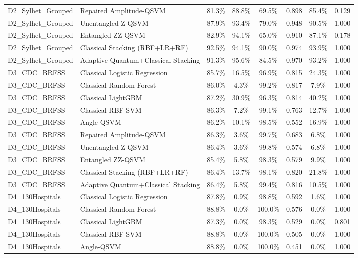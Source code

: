 \documentclass[10pt,twocolumn]{article}
\begin{document}
\begin{table}[t]
\begin{tabular}{llcccccc}
D2\_Sylhet\_Grouped & Repaired Amplitude-QSVM & 81.3\% & 88.8\% & 69.5\% & 0.898 & 85.4\% & 0.129 \\
D2\_Sylhet\_Grouped & Unentangled Z-QSVM & 87.9\% & 93.4\% & 79.0\% & 0.948 & 90.5\% & 1.000 \\
D2\_Sylhet\_Grouped & Entangled ZZ-QSVM & 82.9\% & 94.1\% & 65.0\% & 0.910 & 87.1\% & 0.178 \\
D2\_Sylhet\_Grouped & Classical Stacking (RBF+LR+RF) & 92.5\% & 94.1\% & 90.0\% & 0.974 & 93.9\% & 1.000 \\
D2\_Sylhet\_Grouped & Adaptive Quantum+Classical Stacking & 91.3\% & 95.6\% & 84.5\% & 0.970 & 93.2\% & 1.000 \\
D3\_CDC\_BRFSS & Classical Logistic Regression & 85.7\% & 16.5\% & 96.9\% & 0.815 & 24.3\% & 1.000 \\
D3\_CDC\_BRFSS & Classical Random Forest & 86.0\% & 4.3\% & 99.2\% & 0.817 & 7.9\% & 1.000 \\
D3\_CDC\_BRFSS & Classical LightGBM & 87.2\% & 30.9\% & 96.3\% & 0.814 & 40.2\% & 1.000 \\
D3\_CDC\_BRFSS & Classical RBF-SVM & 86.3\% & 7.2\% & 99.1\% & 0.763 & 12.7\% & 1.000 \\
D3\_CDC\_BRFSS & Angle-QSVM & 86.2\% & 10.1\% & 98.5\% & 0.552 & 16.9\% & 1.000 \\
D3\_CDC\_BRFSS & Repaired Amplitude-QSVM & 86.3\% & 3.6\% & 99.7\% & 0.683 & 6.8\% & 1.000 \\
D3\_CDC\_BRFSS & Unentangled Z-QSVM & 86.4\% & 3.6\% & 99.8\% & 0.574 & 6.8\% & 1.000 \\
D3\_CDC\_BRFSS & Entangled ZZ-QSVM & 85.4\% & 5.8\% & 98.3\% & 0.579 & 9.9\% & 1.000 \\
D3\_CDC\_BRFSS & Classical Stacking (RBF+LR+RF) & 86.4\% & 13.7\% & 98.1\% & 0.820 & 21.8\% & 1.000 \\
D3\_CDC\_BRFSS & Adaptive Quantum+Classical Stacking & 86.4\% & 5.8\% & 99.4\% & 0.816 & 10.5\% & 1.000 \\
D4\_130Hospitals & Classical Logistic Regression & 87.8\% & 0.9\% & 98.8\% & 0.592 & 1.6\% & 1.000 \\
D4\_130Hospitals & Classical Random Forest & 88.8\% & 0.0\% & 100.0\% & 0.576 & 0.0\% & 1.000 \\
D4\_130Hospitals & Classical LightGBM & 87.3\% & 0.0\% & 98.3\% & 0.529 & 0.0\% & 0.801 \\
D4\_130Hospitals & Classical RBF-SVM & 88.8\% & 0.0\% & 100.0\% & 0.505 & 0.0\% & 1.000 \\
D4\_130Hospitals & Angle-QSVM & 88.8\% & 0.0\% & 100.0\% & 0.451 & 0.0\% & 1.000 \\

\end{tabular}
\end{table}
\end{document}
